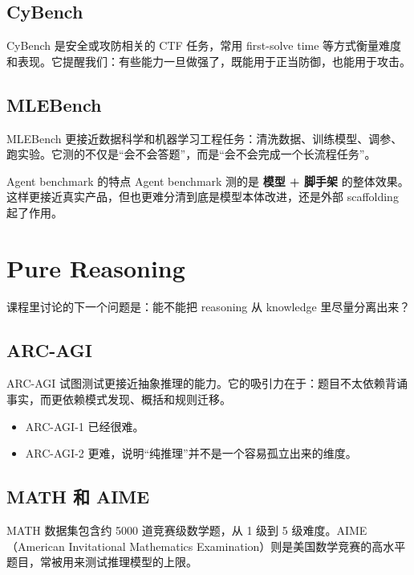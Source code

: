 \documentclass[a4paper]{article}
\begin{document}
\subsection{CyBench}

CyBench 是安全或攻防相关的 CTF 任务，常用 first-solve time 等方式衡量难度和表现。它提醒我们：有些能力一旦做强了，既能用于正当防御，也能用于攻击。

\subsection{MLEBench}

MLEBench 更接近数据科学和机器学习工程任务：清洗数据、训练模型、调参、跑实验。它测的不仅是“会不会答题”，而是“会不会完成一个长流程任务”。

\begin{importantbox}{Agent benchmark 的特点}
Agent benchmark 测的是 \textbf{模型 + 脚手架} 的整体效果。这样更接近真实产品，但也更难分清到底是模型本体改进，还是外部 scaffolding 起了作用。
\end{importantbox}

\section{Pure Reasoning}

课程里讨论的下一个问题是：能不能把 reasoning 从 knowledge 里尽量分离出来？

\subsection{ARC-AGI}

ARC-AGI 试图测试更接近抽象推理的能力。它的吸引力在于：题目不太依赖背诵事实，而更依赖模式发现、概括和规则迁移。

\begin{itemize}
    \item ARC-AGI-1 已经很难。
    \item ARC-AGI-2 更难，说明``纯推理''并不是一个容易孤立出来的维度。
\end{itemize}

\subsection{MATH 和 AIME}

MATH 数据集包含约 5000 道竞赛级数学题，从 1 级到 5 级难度。AIME（American Invitational Mathematics Examination）则是美国数学竞赛的高水平题目，常被用来测试推理模型的上限。
\end{document}

